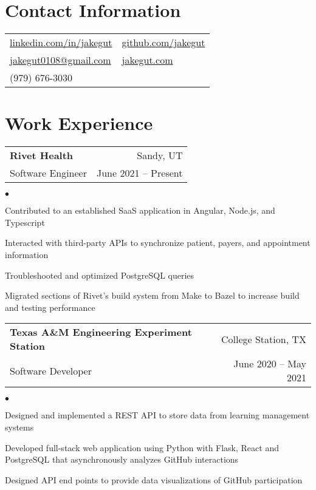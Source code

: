 \documentclass[margin, line]{res}
\makeatletter
\newcommand{\li}{https://linkedin.com/in/jakegut}
\newcommand{\gh}{https://github.com/jakegut}
\newcommand{\personalsite}{https://jakegut.com}
\newcommand{\resumeSubheading}[4]{

\begin{tabular*}{1.01\textwidth}{@{\hspace{-4pt}}l @{\extracolsep{\fill}} r}
\textbf{#1} & #2 \\
      #3 &  #4 
\end{tabular*}\vspace{-2pt}
}
\newenvironment{list2}{
	\begin{list}{$\bullet$}{%
		\setlength{\itemsep}{0in}
		\setlength{\parsep}{0in} \setlength{\parskip}{0in}
		\setlength{\topsep}{0in} \setlength{\partopsep}{0in}
		\setlength{\leftmargin}{0.2in}}}{\end{list}}
\makeatother
\begin{document}
\name{
    \vspace*{-.5in}
	{\huge Jake Gutierrez}
	\hspace*{.1in}
	\vspace*{.1in}
	}

\begin{resume}
\section{\sc Contact Information}
\vspace{.05in}
\begin{tabular}{@{}p{3.17in}p{4in}}
	\href{\li}{linkedin.com/in/jakegut} & \href{\gh}{github.com/jakegut}\\
    \href{mailto:jakegut0108@gmail.com}{jakegut0108@gmail.com} & \href{\personalsite}{jakegut.com}\\
     (979) 676-3030
\end{tabular}

\section{\sc Work Experience}

\vspace{2pt}
                 
\resumeSubheading{{\bf Rivet Health}}{Sandy, UT}
                 {Software Engineer}{June 2021 -- Present}
                 
\begin{list2}
\item{Contributed to an established SaaS application in Angular, Node.js, and Typescript}
\item{Interacted with third-party APIs to synchronize patient, payers, and appointment information}
\item{Troubleshooted and optimized PostgreSQL queries}
\item{Migrated sections of Rivet's build system from Make to Bazel to increase build and testing performance}
\end{list2}

\resumeSubheading{{\bf Texas A\&M Engineering Experiment Station}}{College Station, TX}
                 {Software Developer}{June 2020 -- May 2021}

\begin{list2}
\item{Designed and implemented a REST API to store data from learning management systems }
\item{Developed full-stack web application using Python with Flask, React and PostgreSQL that asynchronously analyzes GitHub interactions }
\item{Designed API end points to provide data visualizations of GitHub participation }
\end{list2}


\end{resume}
\end{document}
